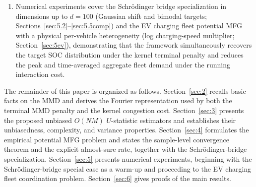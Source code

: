 \documentclass[11pt,leqno]{article}
\theoremstyle{plain}
\theoremstyle{remark}
\theoremstyle{definition}
\numberwithin{equation}{section}
\numberwithin{figure}{section}
\numberwithin{table}{section}
\numberwithin{algorithm}{section}
\begin{document}
\begin{enumerate}[label=\textup{(\roman*)}]
which we use in Section~\ref{sec:5ev} to handle an aggregate-demand congestion cost
of the form $D[\nu]^2=(\int u^{\!*}(s)\nu(ds))^2$.
\item Numerical experiments cover the Schr{\"o}dinger bridge specialization in dimensions up to $d=100$
(Gaussian shift and bimodal targets; Sections~\ref{sec:5.2}--\ref{sec:5.5comp})
and the EV charging fleet potential MFG with a physical per-vehicle heterogeneity
(log charging-speed multiplier; Section~\ref{sec:5ev}),
demonstrating that the framework simultaneously recovers the target SOC distribution
under the kernel terminal penalty and reduces the peak and time-averaged aggregate fleet demand
under the running interaction cost.
\end{enumerate}

The remainder of this paper is organized as follows.
Section~\ref{sec:2} recalls basic facts on the MMD and derives the Fourier representation
used by both the terminal MMD penalty and the kernel congestion cost.
Section~\ref{sec:3} presents the proposed unbiased $O(NM)$ $U$-statistic estimators
and establishes their unbiasedness, complexity, and variance properties.
Section~\ref{sec:4} formulates the empirical potential MFG problem
and states the sample-level convergence theorem and the explicit almost-sure rate,
together with the Schr{\"o}dinger-bridge specialization.
Section~\ref{sec:5} presents numerical experiments,
beginning with the Schr{\"o}dinger-bridge special case as a warm-up
and proceeding to the EV charging fleet coordination problem.
Section~\ref{sec:6} gives proofs of the main results.
\end{document}
